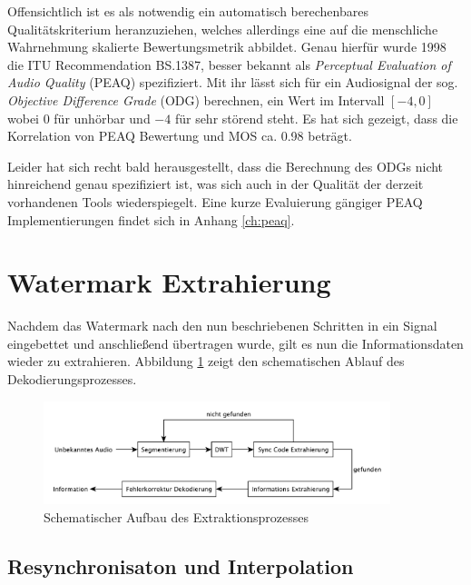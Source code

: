 Offensichtlich ist es als notwendig ein automatisch berechenbares Qualitätskriterium heranzuziehen, welches allerdings eine auf die menschliche Wahrnehmung skalierte Bewertungsmetrik abbildet. Genau hierfür wurde 1998 die ITU Recommendation BS.1387\cite{rec1998bs}, besser bekannt als \textit{Perceptual Evaluation of Audio Quality} (PEAQ) spezifiziert. Mit ihr lässt sich für ein Audiosignal der sog. \textit{Objective Difference Grade} (ODG) berechnen, ein Wert im Intervall $[-4,0]$ wobei $0$ für  \glqq{}unhörbar\grqq{} und $-4$ für \glqq{}sehr störend\grqq{} steht. Es hat sich gezeigt, dass die Korrelation von PEAQ Bewertung und MOS ca. 0.98 beträgt\cite{al2011dwt}.

Leider hat sich recht bald herausgestellt, dass die Berechnung des ODGs nicht hinreichend genau spezifiziert ist\cite{kabal2002examination}\cite{campeanu2005peaq}, was sich auch in der Qualität der derzeit vorhandenen Tools wiederspiegelt. Eine kurze Evaluierung gängiger PEAQ Implementierungen findet sich in Anhang \ref{ch:peaq}.


\section{Watermark Extrahierung}
\label{sec:extraction}

Nachdem das Watermark nach den nun beschriebenen Schritten in ein Signal eingebettet und anschließend übertragen wurde, gilt es nun die Informationsdaten wieder zu extrahieren. Abbildung \ref{fig:diagram-decoder} zeigt den schematischen Ablauf des Dekodierungsprozesses.

\begin{figure}[h]
	\centering
	\includegraphics[width=0.9\textwidth]{figures/diagram-decoder.pdf}
	\caption{Schematischer Aufbau des Extraktionsprozesses}
	\label{fig:diagram-decoder}
\end{figure}


\subsection{Resynchronisaton und Interpolation}

